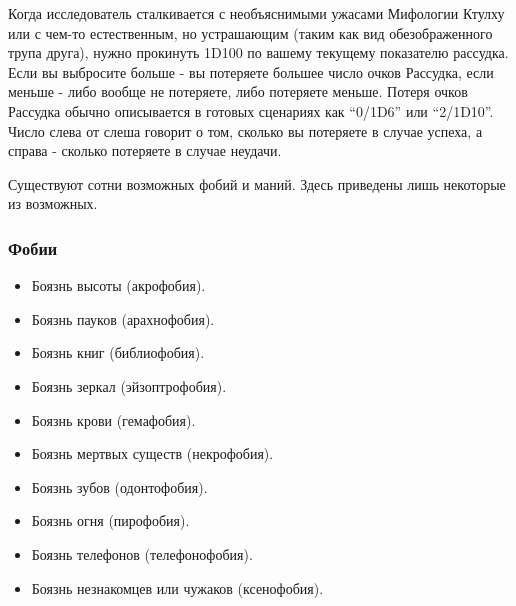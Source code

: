 \documentclass[letterpaper,twocolumn,openany, twoside, 11pt, usenames]{cocbook}
\begin{document}
Когда исследователь сталкивается с необъяснимыми ужасами Мифологии Ктулху или с чем-то естественным, но устрашающим (таким как вид обезображенного трупа друга), нужно прокинуть 1D100 по вашему текущему показателю рассудка. Если вы выбросите больше - вы потеряете большее число очков Рассудка, если меньше - либо вообще не потеряете, либо потеряете меньше. Потеря очков Рассудка обычно описывается в готовых сценариях как ``0/1D6'' или ``2/1D10''. Число слева от слеша говорит о том, сколько вы потеряете в случае успеха, а справа - сколько потеряете в случае неудачи.
\begin{fullcocpaperbox}{}{}
  Существуют сотни возможных фобий и маний. Здесь приведены лишь некоторые из возможных.
  \begin{multicols}{2}
  \subsubsection*{Фобии}
  \begin{itemize}[leftmargin=4mm]
  \item Боязнь высоты (акрофобия).
  \item Боязнь пауков (арахнофобия).
  \item Боязнь книг (библиофобия).
  \item Боязнь зеркал (эйзоптрофобия).
  \item Боязнь крови (гемафобия).
  \item Боязнь мертвых существ (некрофобия).
  \item Боязнь зубов (одонтофобия).
  \item Боязнь огня (пирофобия).
  \item Боязнь телефонов (телефонофобия).
  \item Боязнь незнакомцев или чужаков (ксенофобия).
\end{itemize}
  \bigbreak
  \bigbreak
  \bigbreak  \bigbreak
  \bigbreak
  \bigbreak

\end{multicols}
\end{fullcocpaperbox}
\end{document}
